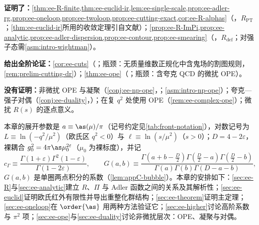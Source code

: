 \begin{tcolorbox}[enhanced,breakable,title=本章证明了什么／没有证明什么,fonttitle=\bfseries,
  colback=gray!3!white,colframe=gray!55!black,boxrule=0.6pt,arc=2pt,
  left=5pt,right=5pt,top=3pt,bottom=3pt,before skip=6pt,after skip=6pt]
\textbf{证明了：}\cref{thm:ee-R-finite,thm:ee-euclid-ir,lem:ee-single-scale,prop:ee-adler-rg,prop:ee-oneloop,prop:ee-twoloop,prop:ee-cutting-exact,cor:ee-R-alphas}（\tagR，$R_{\mathrm{PT}}$；\cref{thm:ee-euclid-ir}所用的收敛定理引自文献）；\cref{prop:ee-R-ImPi,prop:ee-analytic,prop:ee-adler-dispersion,prop:ee-contour,prop:ee-smearing}（\tagR，$R_{\mathrm{def}}$；对强子态需\cref{asm:intro-wightman}）。\par
\textbf{给出全阶论证：}\cref{cor:ee-cuts}（\tagA；瓶颈：无质量维数正规化中含鬼场的割图规则，\cref{rem:prelim-cutting-dr}）；\cref{thm:ee-ope}（\tagA；瓶颈：含夸克 QCD 的微扰 OPE）。\par
\textbf{没有证明：}非微扰 OPE 与凝聚（\cref{conj:ee-np-ope}，\tagC；\cref{asm:intro-np-ope}）；夸克—强子对偶（\cref{conj:ee-duality}，\tagC）；在复 $q^2$ 处使用 OPE（\cref{rem:ee-complex-ope}）；微扰 $R(s)$ 的逐点意义。
\end{tcolorbox}

本章的展开参数是 $a\equiv\as(\mu)/\pi$（记号约定见\cref{tab:front-notation}），对数记号为 $L\equiv\ln(-q^2/\mu^2)$（欧氏区 $q^2<0$）与 $\ell\equiv\ln(s/\mu^2)$（$s>0$）；$D=4-2\varepsilon$，裸耦合 $g_0^2=4\pi\as\mu_0^{2\varepsilon}$（$\mu_0$ 为裸标度），并记
\begin{equation}\label{eq:ee-cGamma}
c_\Gamma\equiv\frac{\Gamma(1+\varepsilon)\Gamma^2(1-\varepsilon)}{\Gamma(1-2\varepsilon)},\qquad
G(a,b)\equiv\frac{\Gamma(a+b-\frac D2)\Gamma(\frac D2-a)\Gamma(\frac D2-b)}{\Gamma(a)\Gamma(b)\Gamma(D-a-b)} ,
\end{equation}
$G(a,b)$ 是单圈两点积分的系数（\cref{lem:appC-bubble}）。本章的安排如下：\cref{sec:ee-R}与\cref{sec:ee-analytic}建立 $R$、$\Pi$ 与 Adler 函数之间的关系及其解析性；\cref{sec:ee-euclid}证明欧氏红外有限性并导出重整化群结构；\cref{sec:ee-theorem}证明主定理；\cref{sec:ee-oneloop}在 $\order{\as}$ 用两种方法验证它；\cref{sec:ee-higher}讨论高阶系数与 $\pi^2$ 项；\cref{sec:ee-ope}与\cref{sec:ee-duality}讨论非微扰层次：OPE、凝聚与对偶。
